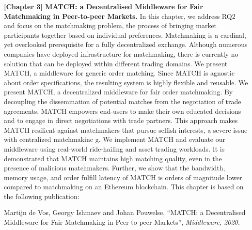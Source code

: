\textbf{[Chapter 3] MATCH: a Decentralised Middleware for Fair Matchmaking in Peer-to-peer Markets.}
In this chapter, we address RQ2 and focus on the matchmaking problem, the process of bringing market participants together based on individual preferences.
Matchmaking is a cardinal, yet overlooked prerequisite for a fully decentralized exchange.
Although numerous companies have deployed infrastructure for matchmaking, there is currently no solution that can be deployed within different trading domains.
We present MATCH, a middleware for generic order matching.
Since MATCH is agnostic about order specifications, the resulting system is highly flexible and reusable.
We present MATCH, a decentralized middleware for fair order matchmaking.
By decoupling the dissemination of potential matches from the negotiation of trade agreements, MATCH empowers end-users to make their own educated decisions and to engage in direct negotiations with trade partners.
This approach makes MATCH resilient against matchmakers that pursue selfish interests, a severe issue with centralized matchmakinc	g.
We implement MATCH and evaluate our middleware using real-world ride-hailing and asset trading workloads.
It is demonstrated that MATCH maintains high matching quality, even in the presence of malicious matchmakers.
Further, we show that the bandwidth, memory usage, and order fulfill latency of MATCH is orders of magnitude lower compared to matchmaking on an Ethereum blockchain.
This chapter is based on the following publication:

Martijn de Vos, Georgy Ishmaev and Johan Pouwelse, \enquote{MATCH: a Decentralised Middleware for Fair Matchmaking in Peer-to-peer Markets}, \emph{Middleware, 2020.}\\

